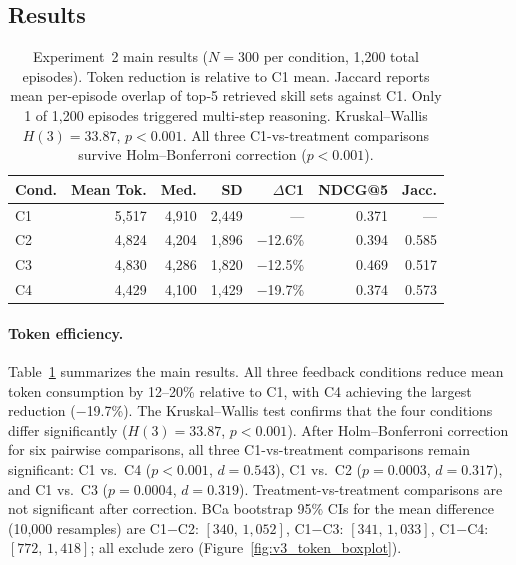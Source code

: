 \subsection{Results}

\begin{table}[t]
\centering
\small
\begin{tabular}{lrrrrrr}
\toprule
\textbf{Cond.} & \textbf{Mean Tok.} & \textbf{Med.} & \textbf{SD} & \textbf{$\Delta$C1} & \textbf{NDCG@5} & \textbf{Jacc.} \\
\midrule
C1 & 5{,}517 & 4{,}910 & 2{,}449 & --- & 0.371 & --- \\
C2 & 4{,}824 & 4{,}204 & 1{,}896 & $-$12.6\% & 0.394 & 0.585 \\
C3 & 4{,}830 & 4{,}286 & 1{,}820 & $-$12.5\% & 0.469 & 0.517 \\
C4 & 4{,}429 & 4{,}100 & 1{,}429 & $-$19.7\% & 0.374 & 0.573 \\
\bottomrule
\end{tabular}
\caption{Experiment~2 main results ($N{=}300$ per condition, 1{,}200 total episodes). Token reduction is relative to C1 mean. Jaccard reports mean per-episode overlap of top-5 retrieved skill sets against C1. Only 1 of 1{,}200 episodes triggered multi-step reasoning. Kruskal--Wallis $H(3){=}33.87$, $p{<}0.001$. All three C1-vs-treatment comparisons survive Holm--Bonferroni correction ($p{<}0.001$).}
\label{tab:v3_results}
\end{table}

\paragraph{Token efficiency.}
Table~\ref{tab:v3_results} summarizes the main results.
All three feedback conditions reduce mean token consumption by 12--20\% relative to C1, with C4 achieving the largest reduction ($-$19.7\%).
The Kruskal--Wallis test confirms that the four conditions differ significantly ($H(3){=}33.87$, $p{<}0.001$).
After Holm--Bonferroni correction for six pairwise comparisons, all three C1-vs-treatment comparisons remain significant: C1 vs.\ C4 ($p{<}0.001$, $d{=}0.543$), C1 vs.\ C2 ($p{=}0.0003$, $d{=}0.317$), and C1 vs.\ C3 ($p{=}0.0004$, $d{=}0.319$).
Treatment-vs-treatment comparisons are not significant after correction.
BCa bootstrap 95\% CIs for the mean difference (10{,}000 resamples) are C1$-$C2: $[340,\, 1{,}052]$, C1$-$C3: $[341,\, 1{,}033]$, C1$-$C4: $[772,\, 1{,}418]$; all exclude zero (Figure~\ref{fig:v3_token_boxplot}).


